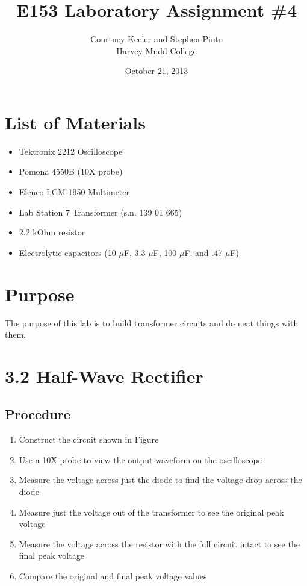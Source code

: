 \documentclass[12pt,letterpaper]{report}
\begin{document}
\title{E153 Laboratory Assignment \#4}
\author{Courtney Keeler and Stephen Pinto\\
Harvey Mudd College}
\date{October 21, 2013}
\maketitle

\section*{List of Materials}
\begin{itemize}
	\item Tektronix 2212 Oscilloscope
	\item Pomona 4550B (10X probe)
	\item Elenco LCM-1950 Multimeter
	\item Lab Station 7 Transformer (s.n. 139 01 665)
	\item 2.2 kOhm resistor
	\item Electrolytic capacitors (10 $\mu$F, 3.3 $\mu$F, 100 $\mu$F, and .47 $\mu$F)
\end{itemize}

\section*{Purpose}
The purpose of this lab is to build transformer circuits and do neat things with them.

\section*{3.2 Half-Wave Rectifier}
\subsection*{Procedure}

\begin{enumerate}
\item Construct the circuit shown in Figure %
\item Use a 10X probe to view the output waveform on the oscilloscope
\item Measure the voltage across just the diode to find the voltage drop across the diode
\item Measure just the voltage out of the transformer to see the original peak voltage
\item Measure the voltage across the resistor with the full circuit intact to see the final peak voltage
\item Compare the original and final peak voltage values
\end{enumerate}
\end{document}
